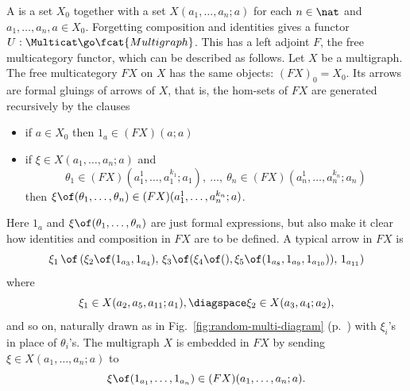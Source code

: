 A %
%
%
is a set $X_0$ together with a set $X(a_1, \ldots,
a_n; a)$ for each $n\in\nat$ and $a_1, \ldots, a_n, a \in X_0$.  Forgetting
composition and identities gives a functor $U: \Multicat \go
\fcat{Multigraph}$.  This has a left adjoint $F$, the free%
% 
%
multicategory functor, which can be described as follows.  Let $X$ be a
multigraph.  The free multicategory $FX$ on $X$ has the same objects:
$(FX)_0 = X_0$.  Its arrows are formal gluings of arrows of $X$, that is, the
hom-sets of $FX$ are generated recursively by the clauses
%
\begin{itemize}
\item\label{p:free-plain-clauses}
if $a \in X_0$ then $1_a \in (FX)(a;a)$
\item if $\xi\in X(a_1, \ldots, a_n; a)$ and 
\[
\theta_1 \in (FX)(a_1^1, \ldots, a_1^{k_1}; a_1), 
\ \ldots,\  
\theta_n \in (FX)(a_n^1, \ldots, a_n^{k_n}; a_n)
\]
then $\xi \of (\theta_1, \ldots, \theta_n) \in
(FX)(a_1^1, \ldots, a_n^{k_n}; a)$. 
\end{itemize}
%
Here $1_a$ and $\xi \of (\theta_1, \ldots, \theta_n)$ are just formal
expressions, but also make it clear how identities and composition in $FX$
are to be defined.  A typical arrow in $FX$ is
\[
\xi_1 \, \of \,
(\xi_2 \of (1_{a_3}, 1_{a_4}), \,
\xi_3 \of (\xi_4 \of (), 
	\xi_5 \of (1_{a_8}, 1_{a_9}, 1_{a_{10}})), \,
1_{a_{11}})
\]
where
\[
\xi_1 \in X(a_2, a_5, a_{11}; a_1),
\diagspace
\xi_2 \in X(a_3, a_4; a_2),
\]
and so on, naturally drawn as in Fig.~\ref{fig:random-multi-diagram}
(p.~\pageref{fig:random-multi-diagram}) with $\xi_i$'s in place of
$\theta_i$'s.  The multigraph $X$ is embedded in $FX$ by sending $\xi \in
X(a_1, \ldots, a_n; a)$ to
\[
\xi\of (1_{a_1}, \ldots, 1_{a_n}) \in (FX)(a_1, \ldots, a_n; a).
\]

